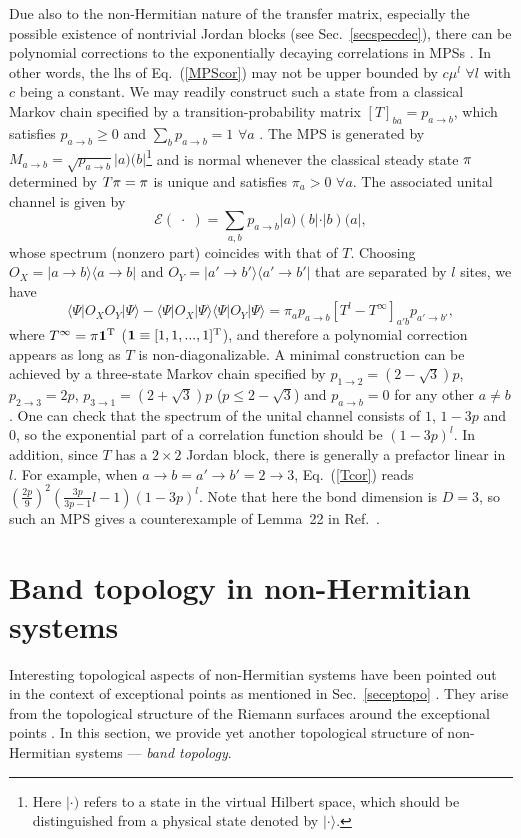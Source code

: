 \documentclass{tADP2e}
\theoremstyle{plain}
\theoremstyle{plain}
\theoremstyle{definition}
\begin{document}
Due also to the non-Hermitian nature of the transfer matrix, especially the possible existence of nontrivial Jordan blocks (see Sec.~\ref{secspecdec}), there can be polynomial corrections to the exponentially decaying correlations in MPSs \cite{SO15}. In other words, the lhs of Eq.~(\ref{MPScor}) may not be upper bounded by $c\mu^l$ $\forall l$ with $c$ being a constant. We may readily construct such a state from a classical Markov chain specified by a transition-probability matrix $[T]_{ba}=p_{a\to b}$, which satisfies $p_{a\to b}\ge0$ and $\sum_b p_{a\to b}=1$ $\forall a$ \cite{GM18,GI19}. The MPS is generated by $M_{a\to b}=\sqrt{p_{a\to b}}|a)(b|$\footnote{Here $|\cdot)$ refers to a state in the virtual Hilbert space, which should be distinguished from a physical state denoted by $|\cdot\rangle$.} and is normal whenever the classical steady state $\bold{\pi}$ determined by $T\bold{\pi}=\bold{\pi}$ is unique and satisfies $\pi_a>0$ $\forall a$. The associated unital channel is given by
\begin{equation}
\mathcal{E}(\;\cdot\;)=\sum_{a,b}p_{a\to b} |a)(b|\cdot|b)(a|,
\end{equation}
whose spectrum (nonzero part) coincides with that of $T$. Choosing $O_X=|a\to b\rangle\langle a\to b|$ and $O_Y=|a'\to b'\rangle\langle a'\to b'|$ that are separated by $l$ sites, we have  
\begin{equation}
\langle\Psi|O_XO_Y|\Psi\rangle - \langle\Psi|O_X|\Psi\rangle\langle\Psi|O_Y|\Psi\rangle=\pi_a p_{a\to b}[T^l-T^\infty]_{a'b}p_{a'\to b'},
\label{Tcor}
\end{equation}
where $T^\infty=\pi\bold{1}^{\rm T}$ ($\bold{1}\equiv[1,1,...,1]^{\rm T}$), and therefore a polynomial correction appears as long as $T$ is non-diagonalizable. A minimal construction  
can be achieved by a three-state Markov chain specified by $p_{1\to2}=(2-\sqrt{3})p$, $p_{2\to3}=2p$, $p_{3\to1}=(2+\sqrt{3})p$ ($p\le 2-\sqrt{3}$) and $p_{a\to b}=0$ for any other $a\neq b$. One can check that the spectrum of the unital channel consists of $1$, $1-3p$ and $0$, so the exponential part of a correlation function should be $(1-3p)^l$. In addition, since $T$ has a $2\times2$ Jordan block, there is generally a prefactor linear in $l$. For example, when $a\to b=a'\to b'=2\to3$, Eq.~(\ref{Tcor}) reads $(\frac{2p}{9})^2(\frac{3p}{3p-1}l-1)(1-3p)^l$. Note that here the bond dimension is $D=3$, so such an MPS gives a counterexample of Lemma~22 in Ref.~\cite{FGSLB15}.



\section{Band topology in non-Hermitian systems\label{sec5}}
Interesting topological aspects of non-Hermitian systems have been pointed out in the context of exceptional points as mentioned in Sec.~\ref{seceptopo} \cite{DC01,WDH12}.
They arise %
from the topological structure of the Riemann surfaces around the exceptional points \cite{HWD01}.
In this section, we provide yet another topological structure of %
non-Hermitian systems --- %
\emph{band topology}.
\end{document}

